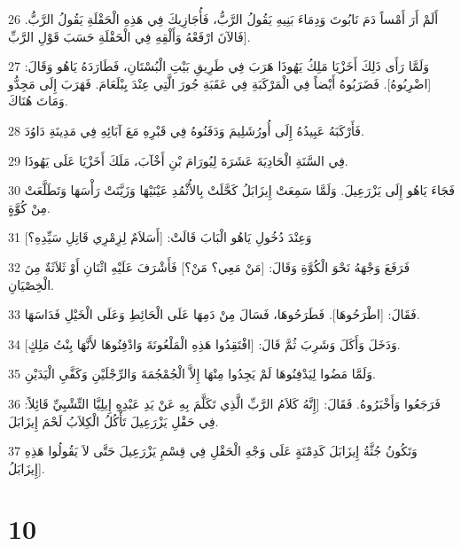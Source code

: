 \par 26 أَلَمْ أَرَ أَمْساً دَمَ نَابُوتَ وَدِمَاءَ بَنِيهِ يَقُولُ الرَّبُّ، فَأُجَازِيكَ فِي هَذِهِ الْحَقْلَةِ يَقُولُ الرَّبُّ. فَالآنَ ارْفَعْهُ وَأَلْقِهِ فِي الْحَقْلَةِ حَسَبَ قَوْلِ الرَّبِّ].
\par 27 وَلَمَّا رَأَى ذَلِكَ أَخَزْيَا مَلِكُ يَهُوذَا هَرَبَ فِي طَرِيقِ بَيْتِ الْبُسْتَانِ، فَطَارَدَهُ يَاهُو وَقَالَ: [اضْرِبُوهُ]. فَضَرَبُوهُ أَيْضاً فِي الْمَرْكَبَةِ فِي عَقَبَةِ جُورَ الَّتِي عِنْدَ يِبْلَعَامَ. فَهَرَبَ إِلَى مَجِدُّو وَمَاتَ هُنَاكَ.
\par 28 فَأَرْكَبَهُ عَبِيدُهُ إِلَى أُورُشَلِيمَ وَدَفَنُوهُ فِي قَبْرِهِ مَعَ آبَائِهِ فِي مَدِينَةِ دَاوُدَ.
\par 29 فِي السَّنَةِ الْحَادِيَةَ عَشَرَةَ لِيُورَامَ بْنِ أَخْآبَ، مَلَكَ أَخَزْيَا عَلَى يَهُوذَا.
\par 30 فَجَاءَ يَاهُو إِلَى يَزْرَعِيلَ. وَلَمَّا سَمِعَتْ إِيزَابَلُ كَحَّلَتْ بِالأُثْمُدِ عَيْنَيْهَا وَزَيَّنَتْ رَأْسَهَا وَتَطَلَّعَتْ مِنْ كُوَّةٍ.
\par 31 وَعِنْدَ دُخُولِ يَاهُو الْبَابَ قَالَتْ: [أَسَلاَمٌ لِزِمْرِي قَاتِلِ سَيِّدِهِ؟]
\par 32 فَرَفَعَ وَجْهَهُ نَحْوَ الْكُوَّةِ وَقَالَ: [مَنْ مَعِي؟ مَنْ؟] فَأَشْرَفَ عَلَيْهِ اثْنَانِ أَوْ ثَلاَثَةٌ مِنَ الْخِصْيَانِ.
\par 33 فَقَالَ: [اطْرَحُوهَا]. فَطَرَحُوهَا، فَسَالَ مِنْ دَمِهَا عَلَى الْحَائِطِ وَعَلَى الْخَيْلِ فَدَاسَهَا.
\par 34 وَدَخَلَ وَأَكَلَ وَشَرِبَ ثُمَّ قَالَ: [افْتَقِدُوا هَذِهِ الْمَلْعُونَةَ وَادْفِنُوهَا لأَنَّهَا بِنْتُ مَلِكٍ].
\par 35 وَلَمَّا مَضُوا لِيَدْفِنُوهَا لَمْ يَجِدُوا مِنْهَا إِلاَّ الْجُمْجُمَةَ وَالرِّجْلَيْنِ وَكَفَّيِ الْيَدَيْنِ.
\par 36 فَرَجَعُوا وَأَخْبَرُوهُ. فَقَالَ: [إِنَّهُ كَلاَمُ الرَّبِّ الَّذِي تَكَلَّمَ بِهِ عَنْ يَدِ عَبْدِهِ إِيلِيَّا التِّشْبِيِّ قَائِلاً: فِي حَقْلِ يَزْرَعِيلَ تَأْكُلُ الْكِلاَبُ لَحْمَ إِيزَابَلَ.
\par 37 وَتَكُونُ جُثَّةُ إِيزَابَلَ كَدِمْنَةٍ عَلَى وَجْهِ الْحَقْلِ فِي قِسْمِ يَزْرَعِيلَ حَتَّى لاَ يَقُولُوا هَذِهِ إِيزَابَلُ].

\chapter{10}

